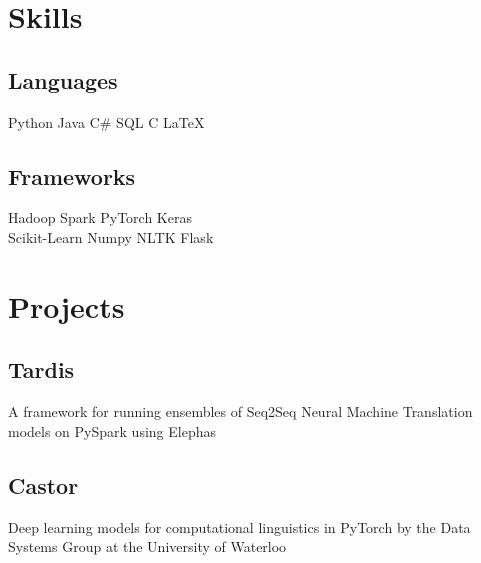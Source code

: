 \documentclass[]{Achyudh_Resume}
\begin{document}
%
%

%
%

\begin{minipage}[t]{0.32\textwidth} 


\section{Skills}
\subsection{Languages}
Python \textbullet{} 
Java \textbullet{}
C\# \textbullet{} 
SQL \textbullet{} 
C \textbullet{} 
\LaTeX\ \\
\halfsectionsep

\subsection{Frameworks}
Hadoop \textbullet{}
Spark \textbullet{}
PyTorch \textbullet{} 
Keras \textbullet{} \\
Scikit-Learn \textbullet{}
Numpy \textbullet{}
NLTK \textbullet{}
Flask \\


\section{Projects}
\subsection{Tardis}
A framework for running ensembles of Seq2Seq Neural Machine Translation models on PySpark using Elephas \\

\subsection{Castor}
Deep learning models for computational linguistics in PyTorch by the Data Systems Group at the University of Waterloo \\ 


\end{minipage}
\end{document}
